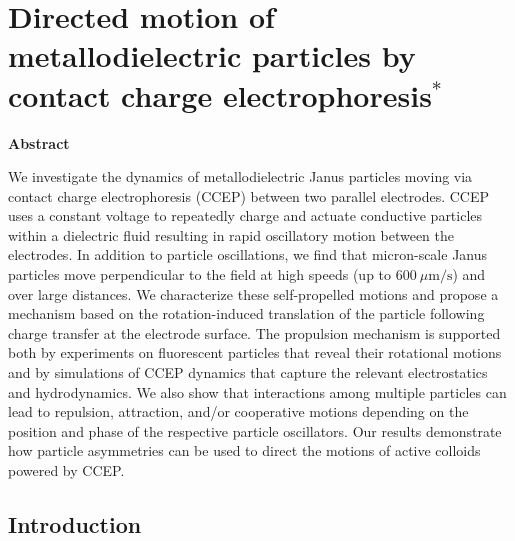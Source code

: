 \chapter{Directed motion of metallodielectric particles by contact charge electrophoresis$^{*}$}

\begin{center}
\vspace*{1\baselineskip}
\textbf{Abstract}
\end{center}
We investigate the dynamics of metallodielectric Janus particles moving via contact charge electrophoresis (CCEP) between two parallel electrodes.
CCEP uses a constant voltage to repeatedly charge and actuate conductive particles within a dielectric fluid resulting in rapid oscillatory motion between the electrodes.
In addition to particle oscillations, we find that micron-scale Janus particles move perpendicular to the field at high speeds (up to $600~\mu\text{m/s}$) and over large distances.
We characterize these self-propelled motions and propose a mechanism based on the rotation-induced translation of the particle following charge transfer at the electrode surface. 
The propulsion mechanism is supported both by experiments on  fluorescent particles that reveal their rotational motions and by simulations of CCEP dynamics that capture the relevant electrostatics and hydrodynamics.
We also show that interactions among multiple particles can lead to repulsion, attraction, and/or cooperative motions depending on the position and phase of the respective particle oscillators.
Our results demonstrate how particle asymmetries can be used to direct the motions of active colloids powered by CCEP.



\section{Introduction}


